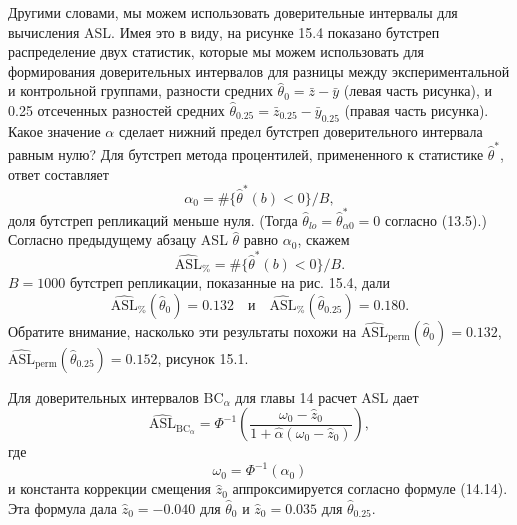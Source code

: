 Другими словами, мы можем использовать доверительные интервалы для вычисления ASL. Имея это в виду, на рисунке 15.4 показано бутстреп распределение двух статистик, которые мы можем использовать для формирования доверительных интервалов для разницы между экспериментальной и контрольной группами, разности средних $\hat{\theta}_0 = \bar{z} - \bar{y}$ (левая часть рисунка), и 0.25 отсеченных разностей средних $\hat{\theta}_{0.25} = \bar{z}_{0.25} - \bar{y}_{0.25}$ (правая часть рисунка). Какое значение $\alpha$ сделает нижний предел бутстреп доверительного интервала равным нулю? Для бутстреп метода процентилей, примененного к статистике $\hat{\theta}^*$, ответ составляет
\begin{equation}
	\alpha_0 = \# \{ \hat{\theta}^*(b) < 0 \}/B,
\end{equation}
доля бутстреп репликаций меньше нуля. (Тогда $\hat{\theta}_{lo} = \hat{\theta}^*_{\alpha 0} = 0$ согласно (13.5).) Согласно предыдущему абзацу ASL $\hat{\theta}$ равно $\alpha_0$, скажем
\begin{equation}
	\widehat{\text{ASL}}_{\%} = \#\{\hat{\theta}^*(b)<0\}/B.
\end{equation}
$B = 1000$ бутстреп репликации, показанные на рис. 15.4, дали
\begin{equation}
	\widehat{\text{ASL}}_{\%}(\hat{\theta}_0) = 0.132 \quad \text{и} \quad \widehat{\text{ASL}}_{\%}(\hat{\theta}_{0.25}) = 0.180.
\end{equation}
Обратите внимание, насколько эти результаты похожи на $\widehat{\text{ASL}}_{\text{perm}} (\hat{\theta}_{0}) = 0.132$, $\widehat{\text{ASL}}_{\text{perm}} (\hat{\theta}_{0.25}) = 0.152$, рисунок 15.1.

Для доверительных интервалов $\text{BC}_{\alpha}$ для главы 14 расчет ASL дает
\begin{equation}
	\widehat{\text{ASL}}_{\text{BC}_{\alpha}} = \Phi^{-1} \left( \dfrac{\omega_0 - \hat{z}_0}{1 + \hat{\alpha}(\omega_0 - \hat{z}_0)} \right),
\end{equation}
где
\begin{equation}
	\omega_0 = \Phi^{-1}(\alpha_0)
\end{equation}
и константа коррекции смещения $\hat{z}_0$ аппроксимируется согласно формуле (14.14). Эта формула дала $\hat{z}_0 = -0.040$ для $\hat{\theta}_0$ и $\hat{z}_0 = 0.035$ для $\hat{\theta}_{0.25}$.

